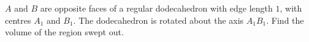 $A$ and $B$ are opposite faces of a regular dodecahedron with edge length $1$, with centres $A_1$ and $B_1$. The dodecahedron is rotated about the axis $A_1B_1$. Find the volume of the region swept out.
